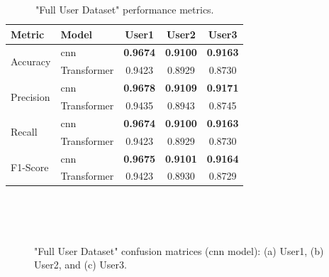 \begin{table}[ht]
    \centering
    \caption{"Full User Dataset" performance metrics.}
    \label{table:results_second_case}
    \begin{tabular}{l|lccc}
        \toprule
        Metric & Model & User1 & User2 & User3 \\
        \midrule
        \multirow{2}{*}{Accuracy} & \acs{cnn} & \textbf{0.9674} & \textbf{0.9100} & \textbf{0.9163} \\
        & Transformer & 0.9423 & 0.8929 & 0.8730 \\
        \midrule
        \multirow{2}{*}{Precision} & \acs{cnn} & \textbf{0.9678} & \textbf{0.9109} & \textbf{0.9171} \\
        & Transformer & 0.9435 & 0.8943 & 0.8745 \\
        \midrule
        \multirow{2}{*}{Recall} & \acs{cnn} & \textbf{0.9674} & \textbf{0.9100} & \textbf{0.9163} \\
        & Transformer & 0.9423 & 0.8929 & 0.8730 \\
        \midrule
        \multirow{2}{*}{F1-Score} & \acs{cnn} & \textbf{0.9675} & \textbf{0.9101} & \textbf{0.9164} \\
        & Transformer & 0.9423 & 0.8930 & 0.8729 \\
        \bottomrule
    \end{tabular}
\end{table}

\begin{figure}[ht]
    \centering
    \begin{subfigure}[b]{0.32\columnwidth}
        {\fontsize{8}{10}\selectfont}
        \caption{\centering}
    \end{subfigure} \
    \begin{subfigure}[b]{0.32\columnwidth}
        {\fontsize{8}{10}\selectfont}
        \caption{\centering}
    \end{subfigure} \
    \begin{subfigure}[b]{0.32\columnwidth}
        {\fontsize{8}{10}\selectfont}
        \caption{\centering}
    \end{subfigure}
    \caption{"Full User Dataset" confusion matrices (\acs{cnn} model): (a) User1, (b) User2, and (c) User3.}
    \label{fig:conf_matrix_full_user}
\end{figure}

